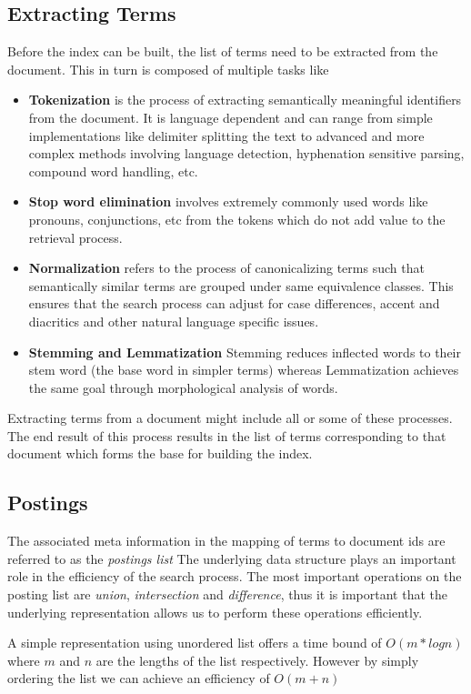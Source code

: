 \subsection{Extracting Terms}
Before the index can be built, the list of terms need to be extracted from the document. This in turn is composed of multiple tasks like
\begin{itemize}
  \item \textbf{Tokenization} is the process of extracting semantically meaningful identifiers from the document.
    It is language dependent and can range from simple implementations like delimiter splitting the text to advanced and more complex
    methods involving language detection, hyphenation sensitive parsing, compound word handling, etc.
  \item \textbf{Stop word elimination} involves extremely commonly used words like pronouns, conjunctions, etc from the tokens which do
    not add value to the retrieval process.
  \item \textbf{Normalization} refers to the process of canonicalizing terms such that semantically similar terms are grouped under
    same equivalence classes. This ensures that the search process can adjust for case differences, accent and diacritics and other
    natural language specific issues.
  \item \textbf{Stemming and Lemmatization} Stemming reduces inflected words to their stem word (the base word in simpler terms) whereas
    Lemmatization achieves the same goal through morphological analysis of words.
\end{itemize}
Extracting terms from a document might include all or some of these processes.
The end result of this process results in the list of terms corresponding to that document which forms the base for building the index.


\subsection{Postings}
The associated meta information in the mapping of terms to document ids are referred to as the \textit{postings list}
The underlying data structure plays an important role in the efficiency of the search process.
The most important operations on the posting list are \textit{union}, \textit{intersection} and \textit{difference},
thus it is important that the underlying representation allows us to perform these operations efficiently.

A simple representation using unordered list offers a time bound of $O(m*log n)$ where $m$ and $n$ are the lengths of the list respectively.
However by simply ordering the list we can achieve an efficiency of $O(m + n)$

